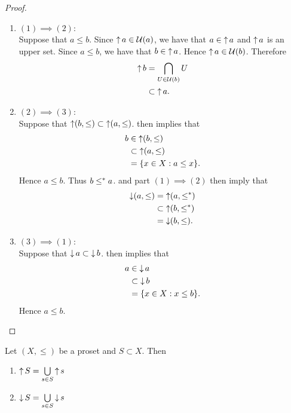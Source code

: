 \documentclass{book}
\begin{document}
	\begin{proof}\
		\begin{enumerate}
			\item $(1) \implies (2)$: \\
			Suppose that $a \leq b$. Since $\operatorname{\uparrow} a \in \mathcal{U}(a)$, we have that $a \in \operatorname{\uparrow} a$ and $\operatorname{\uparrow} a$ is an upper set. Since $a \leq b$, we have that $b \in \operatorname{\uparrow} a$. Hence $\operatorname{\uparrow} a \in \mathcal{U}(b)$. Therefore
			\begin{align*}
				\operatorname{\uparrow} b
				& = \bigcap\limits_{U \in \mathcal{U}(b)} U \\
				& \subset \operatorname{\uparrow} a.
			\end{align*}
			\item $(2) \implies (3)$: \\
			Suppose that $\operatorname{\uparrow} (b, \leq) \subset \operatorname{\uparrow} (a, \leq)$.  then implies that
			\begin{align*}
				b
				& \in \operatorname{\uparrow} (b, \leq) \\
				& \subset \operatorname{\uparrow} (a, \leq) \\
				& = \{x \in X: a \leq x\}.
			\end{align*}
			Hence $a \leq b$. Thus $b \leq^* a$.  and part $(1) \implies (2)$ then imply that 
			\begin{align*}
				\operatorname{\downarrow}(a, \leq)
				& = \operatorname{\uparrow}(a, \leq^*) \\
				& \subset \operatorname{\uparrow}(b, \leq^*) \\
				& = \operatorname{\downarrow}(b, \leq).
			\end{align*} 
			\item $(3) \implies (1)$: \\
			Suppose that $\operatorname{\downarrow} a \subset \operatorname{\downarrow} b$.  then implies that 
			\begin{align*}
				a
				& \in \operatorname{\downarrow} a \\
				& \subset \operatorname{\downarrow} b \\
				& = \{x \in X: x \leq b\}. 
			\end{align*} 
			Hence $a \leq b$.
		\end{enumerate}
	\end{proof}
	
	\begin{ex} 
		Let $(X, \leq)$ be a proset and $S \subset X$. Then 
		\begin{enumerate}
			\item $\operatorname{\uparrow} S = \bigcup\limits_{s \in S} \operatorname{\uparrow} s$
			\item $\operatorname{\downarrow} S = \bigcup\limits_{s \in S} \operatorname{\downarrow} s$
		\end{enumerate}
	\end{ex}
	
\end{document}
